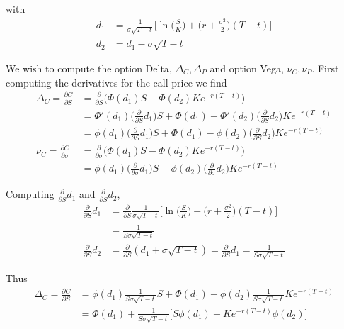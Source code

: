\documentclass[11pt]{article}
\newlength\tindent
\renewcommand{\indent}{\hspace*{\tindent}}
\begin{document}
with 
\begin{align*}
	d_1 &= \frac{1}{\sigma\sqrt{T - t}} \bigg[\ln\bigg(\frac{S}{K}\bigg) + \bigg(r + \frac{\sigma^2}{2}\bigg)(T - t) \bigg]\\
	d_2 &= d_1 - \sigma\sqrt{T - t}
\end{align*}

\indent We wish to compute the option Delta, $\Delta_C, \Delta_P$ and option Vega, $\nu_C, \nu_P$. First computing the derivatives for the call price we find
\begin{align*}
	\Delta_C = \frac{\partial C}{\partial S} &= \frac{\partial}{\partial S} \Big( \Phi(d_1)S - \Phi(d_2)Ke^{-r(T - t)} \Big) \\
	&= \Phi'(d_1)\Big(\frac{\partial}{\partial S}d_1\Big)S + \Phi(d_1) - \Phi'(d_2)\Big(\frac{\partial}{\partial S}d_2\Big)Ke^{-r(T - t)} \\
	&= \phi(d_1)\Big(\frac{\partial}{\partial S}d_1\Big)S + \Phi(d_1) - \phi(d_2)\Big(\frac{\partial}{\partial S}d_2\Big)Ke^{-r(T - t)} \\
	\nu_C = \frac{\partial C}{\partial \sigma} &= \frac{\partial}{\partial \sigma} \Big( \Phi(d_1)S - \Phi(d_2)Ke^{-r(T - t)} \Big) \\
	&= \phi(d_1)\Big(\frac{\partial}{\partial \sigma}d_1\Big)S - \phi(d_2)\Big(\frac{\partial}{\partial \sigma}d_2\Big)Ke^{-r(T - t)}
\end{align*}

Computing $\frac{\partial}{\partial S}d_1$ and $\frac{\partial}{\partial S}d_2$,
\begin{align*}
	\frac{\partial}{\partial S}d_1 &= \frac{\partial}{\partial S} \frac{1}{\sigma\sqrt{T - t}} \bigg[\ln\bigg(\frac{S}{K}\bigg) + \bigg(r + \frac{\sigma^2}{2}\bigg)(T - t) \bigg] \\
	&= \frac{1}{S\sigma\sqrt{T - t}} \\
	\frac{\partial}{\partial S}d_2 &= \frac{\partial}{\partial S}(d_1 + \sigma\sqrt{T - t}) = \frac{\partial}{\partial S}d_1 = \frac{1}{S\sigma\sqrt{T - t}} 
\end{align*}

Thus
\begin{align*}
	\Delta_C = \frac{\partial C}{\partial S} &= \phi(d_1)\frac{1}{S\sigma\sqrt{T - t}} S + \Phi(d_1) - \phi(d_2)\frac{1}{S\sigma\sqrt{T - t}} Ke^{-r(T - t)} \\
	&= \Phi(d_1) + \frac{1}{S\sigma\sqrt{T - t}}\Big[S\phi(d_1) - Ke^{-r(T - t)}\phi(d_2) \Big]
\end{align*}
\end{document}
